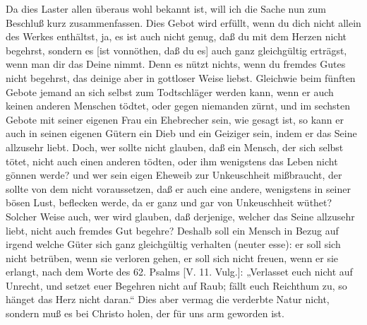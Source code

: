 Da dies Laster allen überaus wohl bekannt ist, will ich die Sache nun zum Beschluß kurz zusammenfassen. Dies Gebot wird erfüllt, wenn du dich nicht allein des Werkes enthältst, ja, es ist auch nicht genug, daß du mit dem Herzen nicht begehrst, sondern es [ist vonnöthen, daß du es] auch ganz gleichgültig erträgst, wenn man dir das Deine nimmt. Denn es nützt nichts, wenn du fremdes Gutes nicht begehrst, das deinige aber in gottloser Weise liebst. Gleichwie beim fünften Gebote jemand an sich selbst zum Todtschläger werden kann, wenn er auch keinen anderen Menschen tödtet, oder gegen niemanden zürnt, und im sechsten Gebote mit seiner eigenen Frau ein Ehebrecher sein, wie gesagt ist, so kann er auch in seinen eigenen Gütern ein Dieb und ein Geiziger sein, indem er das Seine allzusehr liebt. Doch, wer sollte nicht glauben, daß ein Mensch, der sich selbst tötet, nicht auch einen anderen tödten, oder ihm wenigstens das Leben nicht gönnen werde? und wer sein eigen Eheweib zur Unkeuschheit mißbraucht, der sollte von dem nicht voraussetzen, daß er auch eine andere, wenigstens in seiner bösen Lust, beflecken werde, da er ganz und gar von Unkeuschheit wüthet? Solcher Weise auch, wer wird glauben, daß derjenige, welcher das Seine allzusehr liebt, nicht auch fremdes Gut begehre? Deshalb soll ein Mensch in Bezug auf irgend welche Güter sich ganz gleichgültig verhalten (neuter esse): er soll sich nicht betrüben, wenn sie verloren gehen, er soll sich nicht freuen, wenn er sie erlangt, nach dem Worte des 62. Psalms [V. 11. Vulg.]: „Verlasset euch nicht auf Unrecht, und setzet euer Begehren nicht auf Raub; fällt euch Reichthum zu, so hänget das Herz nicht daran.“ Dies aber vermag die verderbte Natur nicht, sondern muß es bei Christo holen, der für uns arm geworden ist.

